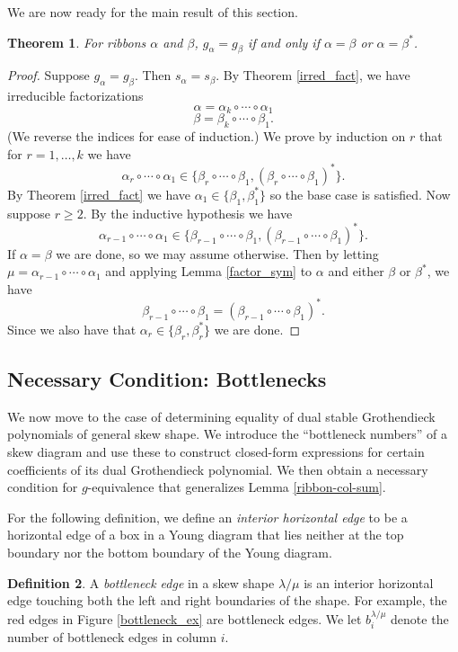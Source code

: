 \documentclass[12pt]{amsart}
\newtheorem{thm}{Theorem}[section]
\theoremstyle{definition}
\newtheorem{defn}[thm]{Definition}
\begin{document}
We are now ready for the main result of this section. 

\begin{thm} \label{thm:littlegribbon}
For ribbons $\alpha$ and $\beta$, $g_\alpha = g_\beta$ if and only if $\alpha = \beta$ or $\alpha = \beta^*$.
\end{thm}
\begin{proof}
Suppose $g_\alpha = g_\beta$. Then $s_\alpha = s_\beta$. By Theorem \ref{irred_fact}, we have irreducible factorizations 
\[
\alpha = \alpha_k \circ \cdots \circ \alpha_1
\]
\[
\beta = \beta_k \circ \cdots \circ \beta_1.
\] 
(We reverse the indices for ease of induction.) We prove by induction on $r$ that for $r = 1, \ldots, k$ we have
\[
\alpha_r \circ \cdots \circ \alpha_1 \in \{ \beta_r \circ \cdots \circ \beta_1, (\beta_r \circ \cdots \circ \beta_1)^* \}.
\]
By Theorem \ref{irred_fact} we have $\alpha_1 \in \{ \beta_1, \beta_1^* \}$ so the base case is satisfied. Now suppose $r \geq 2$. By the inductive hypothesis we have 
\[
\alpha_{r-1} \circ \cdots \circ \alpha_1 \in \{ \beta_{r-1} \circ \cdots \circ \beta_1, (\beta_{r-1} \circ \cdots \circ \beta_1)^* \}.
\]
If $\alpha = \beta$ we are done, so we may assume otherwise. Then by letting $\mu = \alpha_{r-1} \circ \cdots \circ \alpha_1$ and applying Lemma \ref{factor_sym} to $\alpha$ and either $\beta$ or $\beta^*$, we have
\[
\beta_{r-1} \circ \cdots \circ \beta_1 = (\beta_{r-1} \circ \cdots \circ \beta_1)^*.
\]
Since we also have that $\alpha_r \in \{ \beta_r, \beta_r^* \}$ we are done.
\end{proof}


\subsection{Necessary Condition: Bottlenecks}

We now move to the case of determining equality of dual stable Grothendieck polynomials of general skew shape. We introduce the ``bottleneck numbers'' of a skew diagram and use these to construct closed-form expressions for certain coefficients of its dual Grothendieck polynomial. We then obtain a necessary condition for $g$-equivalence that generalizes Lemma \ref{ribbon-col-sum}. 

For the following definition, we define an \textit{interior horizontal edge} to be a horizontal edge of a box in a Young diagram that lies neither at the top boundary nor the bottom boundary of the Young diagram.

\begin{defn}
A \textit{bottleneck edge} in a skew shape $\lambda/\mu$ is an interior horizontal edge touching both the left and right boundaries of the shape. For example, the red edges in Figure \ref{bottleneck_ex} are bottleneck edges. We let $b_i^{\lambda/\mu}$ denote the number of bottleneck edges in column $i$. 
\end{defn}
\end{document}
